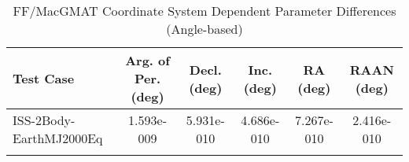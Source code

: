 \begin{table}[htbp!]
\centering
\caption{ FF/MacGMAT Coordinate System Dependent Parameter Differences (Angle-based)}
      \begin{tabular}{lccccc}
      \hline\hline
          Test Case & Arg. of Per. (deg) & Decl. (deg) & Inc. (deg) & RA (deg) & RAAN (deg) \\
         \hline
         ISS-2Body-EarthMJ2000Eq & 1.593e-009 & 5.931e-010 & 4.686e-010 & 7.267e-010 & 2.416e-010 \\
      \hline\hline
      \label{Table: FF-MacGMAT CS Parameters Set 5} 
\end{tabular}
\end{table}
